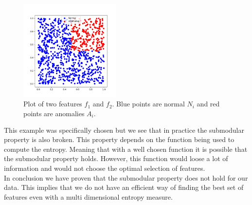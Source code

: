 \documentclass[oneside, a4paper, onecolumn, 11pt]{article}
\begin{document}
\begin{figure}[h]
  \centering
  \includegraphics[width=0.45\textwidth]{images/norm_ano_ex.png}
  \caption{Plot of two features $f_1$ and $f_2$. Blue points are normal $N_i$ and red points are anomalies $A_i$.}
  \label{fig:exstream2dplot}
\end{figure}
This example was specifically chosen but we see that in practice the submodular property is also broken. This property depends on the function being used to compute the entropy. Meaning that with a well chosen function it is possible that the submodular property holds. However, this function would loose a lot of information and would not choose the optimal selection of features.\\
In conclusion we have proven that the submodular property does not hold for our data. This implies that we do not have an efficient way of finding the best set of features even with a multi dimensional entropy measure.\\
\end{document}
